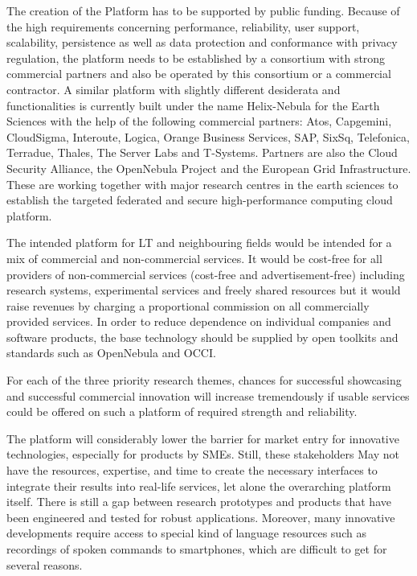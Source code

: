 \documentclass[10pt, plain]{../../metanetpaper}
\begin{document}
\begin{multicols}{2}
The creation of the Platform has to be supported by public funding. Because of the high requirements concerning performance, reliability, user support, scalability, persistence as well as data protection and conformance with privacy regulation, the platform needs to be established by a consortium with strong commercial partners and also be operated by this consortium or a commercial contractor. A similar platform with slightly different desiderata and functionalities is currently built under the name Helix-Nebula for the Earth Sciences with the help of the following commercial partners: Atos, Capgemini, CloudSigma, Interoute, Logica, Orange Business Services, SAP, SixSq, Telefonica, Terradue, Thales, The Server Labs and T-Systems. Partners are also the Cloud Security Alliance, the OpenNebula Project and the European Grid Infrastructure. These are working together with major research centres in the earth sciences to establish the targeted federated and secure high-performance computing cloud platform.
 
The intended platform for LT and neighbouring fields would be intended for a mix of commercial and non-commercial services. It would be cost-free for all providers of non-commercial services (cost-free and advertisement-free) including research systems, experimental services and freely shared resources but it would raise revenues by charging a proportional commission on all commercially provided services.  In order to reduce dependence on individual companies and software products, the base technology should be supplied by open toolkits and standards such as OpenNebula and OCCI.  
 
For each of the three priority research themes, chances for successful showcasing and successful commercial innovation will increase tremendously if usable services could be offered on such a platform of required strength and reliability.
 
The platform will considerably lower the barrier for market entry for innovative technologies, especially for products by SMEs. Still, these stakeholders May not have the resources, expertise, and time to create the necessary interfaces to integrate their results into real-life services, let alone the overarching platform itself. There is still a gap between research prototypes and products that have been engineered and tested for robust applications. Moreover, many innovative developments require access to special kind of language resources such as recordings of spoken commands to smartphones, which are difficult to get for several reasons.
 

\end{multicols}
\end{document}
